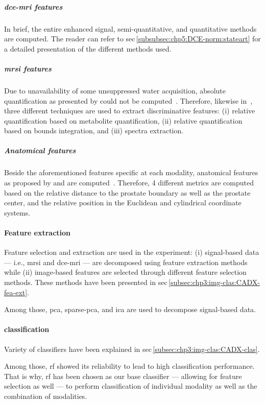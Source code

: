 \documentclass[num-refs]{wiley-article}
\begin{document}
\subparagraph{\ac{dce}-\ac{mri} features}
In brief, the entire enhanced signal, semi-quantitative, and quantitative methods are computed. 
The reader can refer to \ac{sec}\,\ref{subsubsec:chp5:DCE-norm:stateart} for a detailed presentation of the different methods used.
\subparagraph{\ac{mrsi} features}
Due to unavailability of some unsuppressed water acquisition, absolute quantification as presented by \citeauthor{trigui2017automatic} could not be computed~\cite{trigui2017automatic}.
Therefore, likewise in~\cite{Parfait2012}, three different techniques are used to extract discriminative features: (i) relative quantification based on metabolite quantification, (ii) relative quantification based on bounds integration, and (iii) spectra extraction.
\subparagraph{Anatomical features}
Beside the aforementioned features specific at each modality, anatomical features as proposed by \citeauthor{Chen2002} and \citeauthor{Litjens2014} are computed~\cite{Chen2002,Litjens2014}.
Therefore, 4 different metrics are computed based on the relative distance to the prostate boundary as well as the prostate center, and the relative position in the Euclidean and cylindrical coordinate systems.

\paragraph{Feature extraction}
Feature selection and extraction are used in the experiment: (i) signal-based data --- i.e., \ac{mrsi} and \ac{dce}-\ac{mri} --- are decomposed using feature extraction methods while (ii) image-based features are selected through different feature selection methods.
These methods have been presented in \acs{sec}\,\ref{subsec:chp3:img-clas:CADX-fea-ext}.

Among those, \ac{pca}, sparse-\ac{pca}, and \ac{ica} are used to decompose signal-based data.
\paragraph{classification}
Variety of classifiers have been explained in \acs{sec}\,\ref{subsec:chp3:img-clas:CADX-clas}. 

Among those, \ac{rf} showed its reliability to lead to high classification performance.
That is why, \ac{rf} has been chosen as our base classifier --- allowing for feature selection as well --- to perform classification of individual modality as well as the combination of modalities.

\end{document}
